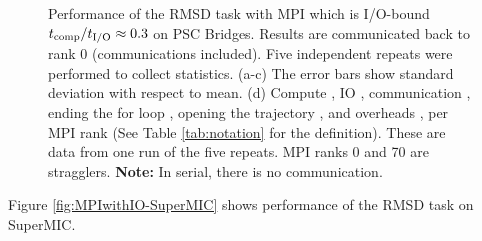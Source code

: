 \begin{figure}[ht!]
\caption{Performance of the RMSD task with MPI which is I/O-bound ${t}_{\text{comp}}/{t}_{\text{I/O}} \approx 0.3$ on PSC Bridges.
Results are communicated back to rank 0 (communications included). Five independent repeats were performed to collect statistics. (a-c) The error bars show
standard deviation with respect to mean. (d) Compute \tcomp, IO \tIO, communication \tcomm, ending the for loop ,
  opening the trajectory , and overheads ,  per MPI rank (See Table \ref{tab:notation} for the definition).
These are data from one run of the five repeats. MPI ranks 0 and 70 are stragglers. \textbf{Note:} In serial, there is no communication.}
\label{fig:MPIwithIO-Bridges}
\end{figure} 


Figure \ref{fig:MPIwithIO-SuperMIC} shows performance of the RMSD task on SuperMIC. 

